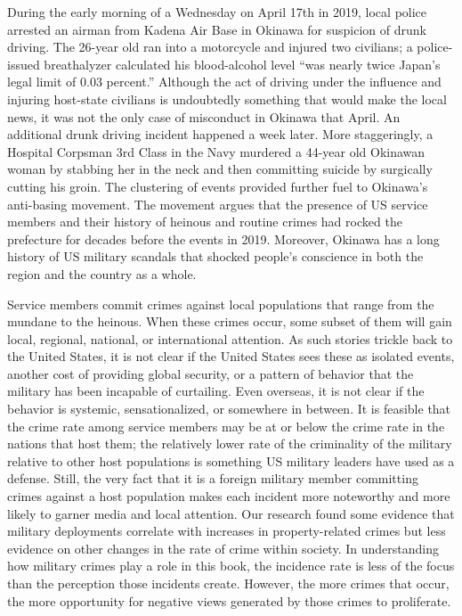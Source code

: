 During the early morning of a Wednesday on April 17th in 2019, local police arrested an airman from Kadena Air Base in Okinawa for suspicion of drunk driving. The 26-year old ran into a motorcycle and injured two civilians; a police-issued breathalyzer calculated his blood-alcohol level ``was nearly twice Japan's legal limit of 0.03 percent.''\cite{Burke2019} Although the act of driving under the influence and injuring host-state civilians is undoubtedly something that would make the local news, it was not the only case of misconduct in Okinawa that April. An additional drunk driving incident happened a week later. More staggeringly, a Hospital Corpsman 3rd Class in the Navy murdered a 44-year old Okinawan woman by stabbing her in the neck and then committing suicide by surgically cutting his groin.\cite{Simkins2109} The clustering of events provided further fuel to Okinawa's anti-basing movement. The movement argues that the presence of US service members and their history of heinous and routine crimes had rocked the prefecture for decades before the events in 2019. Moreover, Okinawa has a long history of US military scandals that shocked people's conscience in both the region and the country as a whole.

Service members commit crimes against local populations that range from the mundane to the heinous. When these crimes occur, some subset of them will gain local, regional, national, or international attention. As such stories trickle back to the United States, it is not clear if the United States sees these as isolated events, another cost of providing global security, or a pattern of behavior that the military has been incapable of curtailing. Even overseas, it is not clear if the behavior is systemic, sensationalized, or somewhere in between. It is feasible that the crime rate among service members may be at or below the crime rate in the nations that host them; the relatively lower rate of the criminality of the military relative to other host populations is something US military leaders have used as a defense.\cite{Gillem2007} Still, the very fact that it is a foreign military member committing crimes against a host population makes each incident more noteworthy and more likely to garner media and local attention. Our research found some evidence that military deployments correlate with increases in property-related crimes but less evidence on other changes in the rate of crime within society.\cite{Allen2011} In understanding how military crimes play a role in this book, the incidence rate is less of the focus than the perception those incidents create. However, the more crimes that occur, the more opportunity for negative views generated by those crimes to proliferate. 

